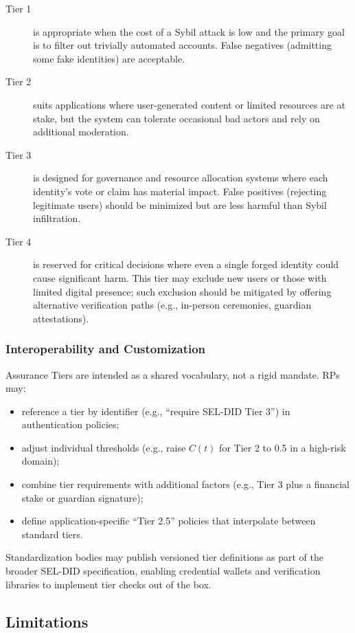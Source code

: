 \documentclass[11pt]{article}
\begin{document}
\begin{description}
  \item[Tier 1] is appropriate when the cost of a Sybil attack is low and the primary goal is to filter out trivially automated accounts. False negatives (admitting some fake identities) are acceptable.
  \item[Tier 2] suits applications where user-generated content or limited resources are at stake, but the system can tolerate occasional bad actors and rely on additional moderation.
  \item[Tier 3] is designed for governance and resource allocation systems where each identity's vote or claim has material impact. False positives (rejecting legitimate users) should be minimized but are less harmful than Sybil infiltration.
  \item[Tier 4] is reserved for critical decisions where even a single forged identity could cause significant harm. This tier may exclude new users or those with limited digital presence; such exclusion should be mitigated by offering alternative verification paths (e.g., in-person ceremonies, guardian attestations).
\end{description}

\subsubsection{Interoperability and Customization}

Assurance Tiers are intended as a shared vocabulary, not a rigid mandate. RPs may:
\begin{itemize}
  \item reference a tier by identifier (e.g., ``require SEL-DID Tier 3'') in authentication policies;
  \item adjust individual thresholds (e.g., raise $C(t)$ for Tier 2 to 0.5 in a high-risk domain);
  \item combine tier requirements with additional factors (e.g., Tier 3 plus a financial stake or guardian signature);
  \item define application-specific ``Tier 2.5'' policies that interpolate between standard tiers.
\end{itemize}

Standardization bodies may publish versioned tier definitions as part of the broader SEL-DID specification, enabling credential wallets and verification libraries to implement tier checks out of the box.

\subsection{Limitations}
\label{sec:limitations}
\end{document}
